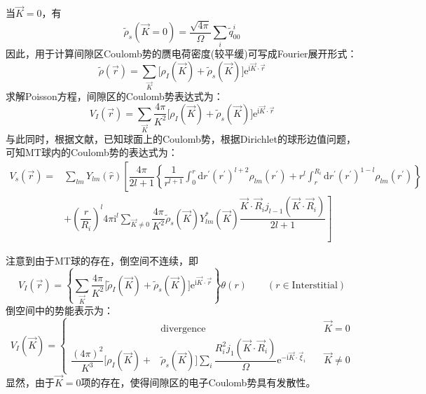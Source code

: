 当$\vec K=0$，有
$$\tilde\rho_s(\vec K=0)=\dfrac{\sqrt{4\pi}}{\Omega}\sum\limits_i\tilde q_{00}^i$$
因此，用于计算间隙区\textrm{Coulomb}势的赝电荷密度(较平缓)可写成\textrm{Fourier}展开形式：
\begin{equation}
	\tilde\rho(\vec r)=\sum_{\vec K}\big[\rho_I(\vec K)+\tilde\rho_s(\vec K)\big]\mathrm{e}^{\mathrm{i}\vec K\cdot\vec r}
	\label{eq_psrho_four}
\end{equation}
求解\textrm{Poisson}方程，间隙区的\textrm{Coulomb}势表达式为：
\begin{equation}
	V_I(\vec r)=\sum_{\vec K}\dfrac{4\pi}{K^2}\big[\rho_I(\vec K)+\tilde\rho_s(\vec K)\big]\mathrm{e}^{\mathrm{i}\vec K\cdot\vec r}
	\label{eq_Vcou_I}
\end{equation}
与此同时，根据文献，已知球面上的\textrm{Coulomb}势，根据\textrm{Dirichlet}的球形边值问题\cite{Jackson}，可知\textrm{MT}球内的\textrm{Coulomb}势的表达式\cite{Singh,Nemoshkalenko-Antonov}为：
\begin{equation}
	\begin{aligned}
		V_s(\vec r)=&\sum_{lm}Y_{lm}(\hat r)\left[\dfrac{4\pi}{2l+1}\left\{\dfrac1{r^{l+1}}\int_0^r\mathrm{d}r^{\prime}(r^{\prime})^{l+2}\rho_{lm}(r^{\prime})+r^l\int_r^{R_i}\mathrm{d}r^{\prime}(r^{\prime})^{1-l}\rho_{lm}(r^{\prime})\right\}\right.\\
		&\left.+\left(\dfrac r{R_i}\right)^l4\pi\mathrm{i}^l\sum_{\vec K\neq0}\dfrac{4\pi}{K^2}\tilde\rho_s(\vec K)Y_{lm}^{\ast}(\vec K)\dfrac{\vec K\cdot\vec R_ij_{l-1}(\vec K\cdot\vec R_i)}{2l+1}\right]
	\end{aligned}
	\label{eq_Vcou_s}
\end{equation}

注意到由于\textrm{MT}球的存在，倒空间不连续，即
\begin{equation}
	V_I(\vec r)=\left\{\sum_{\vec K}\dfrac{4\pi}{K^2}\bigg[\tilde\rho_I(\vec K)+\tilde\rho_s(\vec K)\bigg]\mathrm{e}^{\mathrm{i}\vec K\cdot\vec r}\right\}\theta(r)\qquad(r\in \mathrm{Interstitial})
	\label{eq_Vcou_I_theta}
\end{equation}
倒空间中的势能表示为：
\begin{equation}
	V_I(\vec K)=\left\{
	\begin{aligned}
		&\mathrm{divergence} \qquad &\vec K=0 \\
		\dfrac{(4\pi)^2}{K^3}\bigg[\rho_I(\vec K)+&\tilde\rho_s(\vec K)\bigg]\sum_i\dfrac{R_i^2j_1(\vec K\cdot\vec R_i)}{\Omega}\mathrm{e}^{-\mathrm{i}\vec K\cdot\vec\xi_i}\quad &\vec K\neq0
	\end{aligned}\right.
	\label{eq_Vcou_KI_theta}
\end{equation}
显然，由于$\vec K=0$项的存在，使得间隙区的电子\textrm{Coulomb}势具有发散性。

